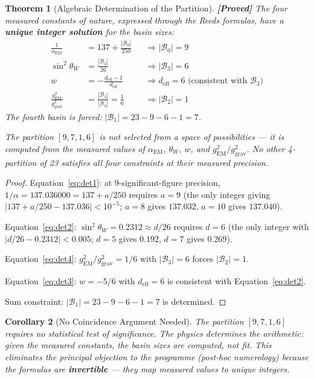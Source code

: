\documentclass[12pt,a4paper]{article}
\newcommand{\proved}[1]{\textcolor{proved}{\textbf{[Proved]}} #1}
\newtheorem{theorem}{Theorem}[section]
\newtheorem{corollary}[theorem]{Corollary}
\theoremstyle{definition}\newtheorem{definition}[theorem]{Definition}
\theoremstyle{remark}\newtheorem{remark}[theorem]{Remark}
\newcommand{\Basin}{\mathcal{B}}
\begin{document}
\begin{theorem}[Algebraic Determination of the Partition]
\label{thm:algebraic}
\proved{The four measured constants of nature, expressed through the Reeds
formulas, have a \textbf{unique integer solution} for the basin sizes:}
\begin{align}
  \frac{1}{\alpha_{\mathrm{EM}}} &= 137 + \frac{|\Basin_0|}{250}
  &&\Rightarrow |\Basin_0| = 9 \label{eq:det1} \\
  \sin^2\theta_W &= \frac{|\Basin_3|}{26}
  &&\Rightarrow |\Basin_3| = 6 \label{eq:det2} \\
  w &= -\frac{d_{\mathrm{eff}} - 1}{d_{\mathrm{eff}}}
  &&\Rightarrow d_{\mathrm{eff}} = 6 \text{ (consistent with }\Basin_3\text{)} \label{eq:det3} \\
  \frac{g_{\mathrm{EM}}^2}{g_{\mathrm{grav}}^2} &= \frac{|\Basin_2|}{|\Basin_3|}
  = \frac{1}{6} &&\Rightarrow |\Basin_2| = 1 \label{eq:det4}
\end{align}
The fourth basin is forced: $|\Basin_1| = 23 - 9 - 6 - 1 = 7$.

The partition $[9, 7, 1, 6]$ is not \emph{selected} from a space of
possibilities --- it is \emph{computed} from the measured values of
$\alpha_{\mathrm{EM}}$, $\theta_W$, $w$, and $g_{\mathrm{EM}}^2/g_{\mathrm{grav}}^2$.
No other 4-partition of 23 satisfies all four constraints at their measured precision.
\end{theorem}

\begin{proof}
Equation~\eqref{eq:det1}: at 9-significant-figure precision,
$1/\alpha = 137.036000 = 137 + a/250$ requires $a = 9$ (the only integer
giving $|137 + a/250 - 137.036| < 10^{-5}$; $a = 8$ gives $137.032$,
$a = 10$ gives $137.040$).

Equation~\eqref{eq:det2}: $\sin^2\theta_W = 0.2312 \approx d/26$ requires
$d = 6$ (the only integer with $|d/26 - 0.2312| < 0.005$; $d = 5$ gives $0.192$,
$d = 7$ gives $0.269$).

Equation~\eqref{eq:det4}: $g_{\mathrm{EM}}^2/g_{\mathrm{grav}}^2 = 1/6$
with $|\Basin_3| = 6$ forces $|\Basin_2| = 1$.

Equation~\eqref{eq:det3}: $w = -5/6$ with $d_{\mathrm{eff}} = 6$ is consistent
with Equation~\eqref{eq:det2}.

Sum constraint: $|\Basin_1| = 23 - 9 - 6 - 1 = 7$ is determined.
\end{proof}

\begin{corollary}[No Coincidence Argument Needed]
The partition $[9,7,1,6]$ requires no statistical test of significance.
The physics \emph{determines} the arithmetic: given the measured constants,
the basin sizes are computed, not fit. This eliminates the principal objection
to the programme (post-hoc numerology) because the formulas are
\textbf{invertible} --- they map measured values to unique integers.
\end{corollary}
\end{document}
